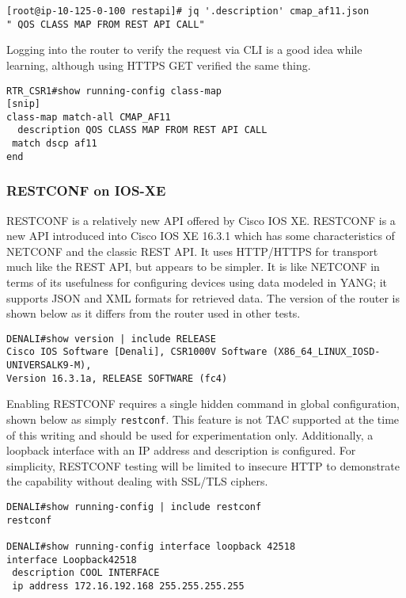 \begin{verbatim}
[root@ip-10-125-0-100 restapi]# jq '.description' cmap_af11.json 
" QOS CLASS MAP FROM REST API CALL"
\end{verbatim}

Logging into the router to verify the request via CLI is a good idea while
learning, although using HTTPS GET verified the same thing.

\begin{verbatim}
RTR_CSR1#show running-config class-map
[snip]
class-map match-all CMAP_AF11
  description QOS CLASS MAP FROM REST API CALL
 match dscp af11 
end
\end{verbatim}

\subsubsection{RESTCONF on IOS-XE}
RESTCONF is a relatively new API offered by Cisco IOS XE\@. RESTCONF is a new
API introduced into Cisco IOS XE 16.3.1 which has some characteristics of
NETCONF and the classic REST API\@. It uses HTTP/HTTPS for transport much like
the REST API, but appears to be simpler. It is like NETCONF in terms of its
usefulness for configuring devices using data modeled in YANG\@; it supports
JSON and XML formats for retrieved data. The version of the router is shown
below as it differs from the router used in other tests.

\begin{verbatim}
DENALI#show version | include RELEASE
Cisco IOS Software [Denali], CSR1000V Software (X86_64_LINUX_IOSD-UNIVERSALK9-M),
Version 16.3.1a, RELEASE SOFTWARE (fc4)
\end{verbatim}

Enabling RESTCONF requires a single hidden command in global configuration,
shown below as simply \verb|restconf|. This feature is not TAC supported at
the time of this writing and should be used for experimentation only.
Additionally, a loopback interface with an IP address and description is
configured. For simplicity, RESTCONF testing will be limited to insecure HTTP
to demonstrate the capability without dealing with SSL/TLS ciphers.

\begin{verbatim}
DENALI#show running-config | include restconf
restconf

DENALI#show running-config interface loopback 42518
interface Loopback42518
 description COOL INTERFACE
 ip address 172.16.192.168 255.255.255.255
\end{verbatim}

